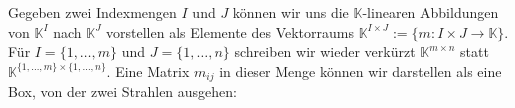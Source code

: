 \documentclass[11pt]{article} %
\renewcommand{\_}{\rule{0.2cm}{.5pt}}
\begin{document}
\begin{changemargin}{20pt}{20pt}
\begin{center}
\begin{minipage}{.2\textwidth}
\end{minipage}

\end{center}

\end{changemargin}
%
\begin{changemargin}{0pt}{0pt}
Gegeben zwei Indexmengen $I$ und $J$ können wir uns die $\mathbb{K}$-linearen Abbildungen von $\mathbb{K}^{I}$ nach $\mathbb{K}^{J}$ vorstellen
als Elemente des Vektorraums $\mathbb{K}^{I \times J} := \{m : I \times J \longrightarrow \mathbb{K}\}$. Für $I = \{1,\dots,m\}$ und $J = \{1,\dots,n\}$
schreiben wir wieder verkürzt $\mathbb{K}^{m \times n}$ statt $\mathbb{K}^{\{1,\dots,m\} \times \{1,\dots,n\}}$.
Eine Matrix $m_{ij}$ in dieser Menge können wir darstellen als eine Box, von der zwei Strahlen ausgehen:
\end{changemargin}

\begin{center}
\begin{changemargin}{20pt}{20pt}
\end{changemargin}
\end{center}
\end{document}
